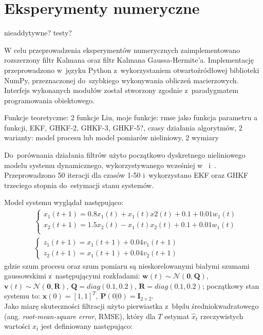 \chapter{Eksperymenty numeryczne}
\label{cha:numeryczne}
nieaddytywne? testy? \par
W celu przeprowadzenia eksperymentów numerycznych zaimplementowano rozszerzony filtr Kalmana oraz filtr Kalmana Gaussa-Hermite'a. Implementację przeprowadzono w~języku Python z~wykorzystaniem otwartoźródłowej biblioteki NumPy, przeznaczonej do~szybkiego wykonywania obliczeń macierzowych. Interfejs wykonanych modułów został stworzony zgodnie z~paradygmatem programowania obiektowego. \par
Funkcje teoretyczne: 2 funkcje Liu, moje funkcje: rmse jako funkcja parametru a funkcji, EKF, GHKF-2, GHKF-3, GHKF-5?, czasy działania algorytmów, 2 warianty: model procesu lub model pomiarów nieliniowy, 2 wymiary \par
Do~porównania działania filtrów użyto początkowo dyskretnego nieliniowego modelu systemu dynamicznego, wykorzystywanego wcześniej w~\cite{Liu} i~\cite{Germani}. Przeprowadzono 50 iteracji dla czasów 1-50 i~wykorzystano EKF oraz GHKF trzeciego stopnia do~estymacji stanu systemów.\par
Model systemu wyglądał następująco:
\begin{align}\label{eq:LiuModel1}
	&\left\{ 
	\begin{array}{l}
	x_1(t+1) = 0.8x_1(t) + x_1(t)x2(t) + 0.1 + 0.01w_1(t) \\
	x_2(t+1) = 1.5x_2(t) - x_1(t)x_2(t) + 0.1 + 0.01w_1(t) \\
	\end{array}
	\right.\nonumber \\
	&\left\{ 
	\begin{array}{l}
	z_1(t+1) = x_1(t+1) + 0.04v_1(t+1) \\
	z_2(t+1) = x_1(t+1) + 0.04v_2(t+1)
	\end{array}
	\right.
\end{align}
gdzie szum procesu oraz szum pomiaru są nieskorelowanymi białymi szumami gaussowskimi z~następującymi rozkładami: $\boldsymbol{w}(t) \sim \mathcal{N}(\boldsymbol{0}, \boldsymbol{Q})$, $\boldsymbol{v}(t) \sim \mathcal{N}(\boldsymbol{0}, \boldsymbol{R})$, $\boldsymbol{Q}=diag(0.1, 0.2)$, $\boldsymbol{R}=diag(0.1, 0.2)$; początkowy stan systemu to: $\boldsymbol{x}(0) = [1,1]^T$, $\boldsymbol{P}(0|0) = \boldsymbol{I}_{2 \times 2}$.\\ 
Jako miarę skuteczności filtracji użyto pierwiastka z~błędu średniokwadratowego (ang. \textit{root-mean-square error}, RMSE), który dla $T$ estymat $\hat{x}_t$ rzeczywistych wartości $x_t$ jest definiowany następująco:
